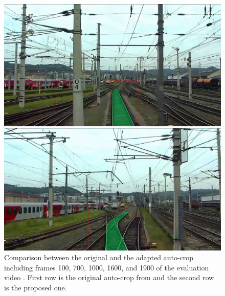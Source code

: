 \begin{figure}[H]
\begin{minipage}{0.195\textwidth}
    \end{minipage}
    \hfill
    \begin{minipage}{0.195\textwidth}
        \includegraphics[width=\textwidth]{PICs/experiments/autocropExperiments/output_frames_improved/frame_1600.png}
    \end{minipage}
    \hfill
    \begin{minipage}{0.195\textwidth}
        \includegraphics[width=\textwidth]{PICs/experiments/autocropExperiments/output_frames_improved/frame_1900.png}
    \end{minipage}

    \begin{minipage}{1.0\textwidth}
        \centering
    \end{minipage}

    \vspace{0.5cm}
    \caption{Comparison between the original and the adapted auto-crop including frames 100, 700, 1000, 1600, and 1900 of the evaluation video \cite{temporalDataset_youtube_video}.
    First row is the original auto-crop from \cite{tepNet2024} and the second row is the proposed one.}
    \label{fig:autocropVideoComparison}
\end{figure}

